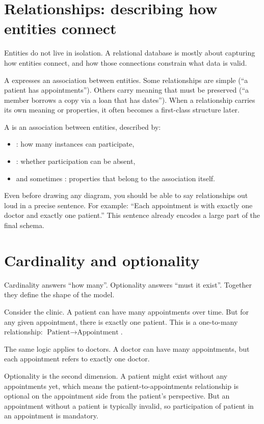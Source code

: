 \section{Relationships: describing how entities connect}
Entities do not live in isolation.
A relational database is mostly about capturing how entities connect, and how those connections constrain what data is valid.

A  expresses an association between entities.
Some relationships are simple (“a patient has appointments”).
Others carry meaning that must be preserved (“a member borrows a copy via a loan that has dates”).
When a relationship carries its own meaning or properties, it often becomes a first-class structure later.

\begin{definitionbox}
A  is an association between entities, described by:
\begin{itemize}
  \item {}: how many instances can participate,
  \item {}: whether participation can be absent,
  \item and sometimes : properties that belong to the association itself.
\end{itemize}
\end{definitionbox}

Even before drawing any diagram, you should be able to say relationships out loud in a precise sentence.
For example: “Each appointment is with exactly one doctor and exactly one patient.”
This sentence already encodes a large part of the final schema.

\section{Cardinality and optionality}
Cardinality answers “how many”.
Optionality answers “must it exist”.
Together they define the shape of the model.

Consider the clinic.
A patient can have many appointments over time.
But for any given appointment, there is exactly one patient.
This is a one-to-many relationship: \(\text{Patient} \rightarrow \text{Appointment}\).

The same logic applies to doctors.
A doctor can have many appointments, but each appointment refers to exactly one doctor.

Optionality is the second dimension.
A patient might exist without any appointments yet, which means the patient-to-appointments relationship is optional on the appointment side from the patient’s perspective.
But an appointment without a patient is typically invalid, so participation of patient in an appointment is mandatory.

